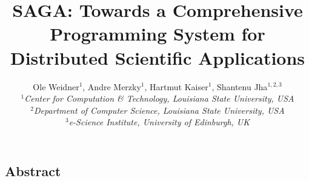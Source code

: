 \documentclass[a4paper,10pt]{article}
\newcommand{\jhanote}[1]{  {\textcolor{red}     { ***Shantenu: #1 }}}
\newcommand{\jhanote}[1]{}
\begin{document}
 \title{ \large \vspace{-3.5em} SAGA: Towards a Comprehensive Programming System for Distributed Scientific Applications }
 
 \author{\normalsize Ole Weidner$^{1}$, Andre Merzky$^{1}$, Hartmut Kaiser$^{1}$, Shantenu Jha$^{1,2,3}$\\
   \small{\emph{$^{1}$Center for Computation \& Technology, Louisiana State University, USA}}\\
   \small{\emph{$^{2}$Department of Computer Science, Louisiana State University, USA}}\\
   \small{\emph{$^{3}$e-Science Institute, University of Edinburgh, UK}}
 }
 \date{}
 \maketitle
 




\subsection*{Abstract}
\end{document}
